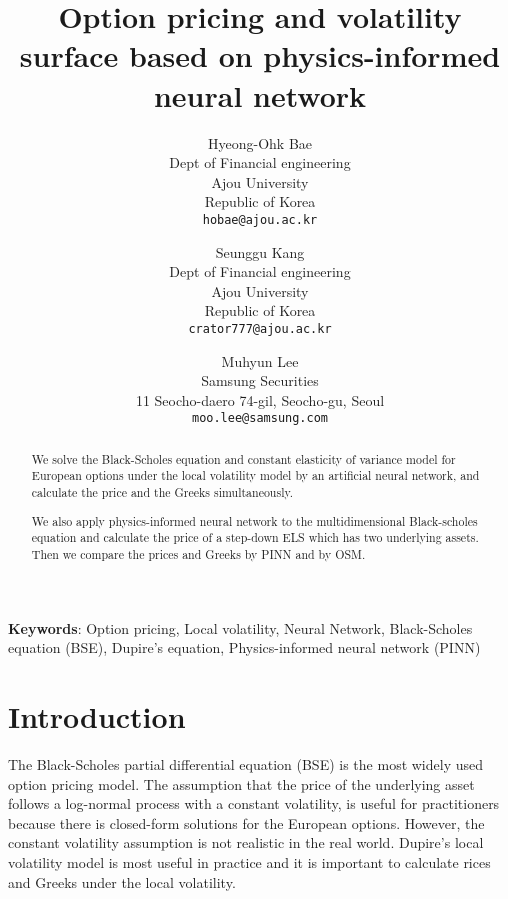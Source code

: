 \documentclass[11pt,reqno]{article}
\title{Option pricing and volatility surface based on physics-informed neural network}
\author{
  Hyeong-Ohk Bae \\
  Dept of Financial engineering \\
  Ajou University \\
  Republic of Korea\\
  \texttt{hobae@ajou.ac.kr} \\
  \and
  Seunggu Kang \\
  Dept of Financial engineering \\
  Ajou University \\
  Republic of Korea\\
  \texttt{crator777@ajou.ac.kr} \\
  \and
  Muhyun Lee \\
  Samsung Securities\\
  11 Seocho-daero 74-gil, Seocho-gu, Seoul\\
  \texttt{moo.lee@samsung.com}
}
\numberwithin{equation}{section}
\begin{document}
\maketitle

\begin{abstract}
We solve the Black-Scholes equation and constant elasticity of variance model
for European options
under the local volatility model
 by an artificial neural network, and calculate the price and the Greeks simultaneously.


We also apply physics-informed neural network to the multidimensional Black-scholes equation
 and calculate the price of a step-down ELS which has two underlying assets.
  Then we compare the prices and Greeks by PINN and by OSM.
\end{abstract}
\noindent\textbf{Keywords}: Option pricing, Local volatility, Neural Network,
Black-Scholes equation (BSE), Dupire's equation, Physics-informed neural network (PINN)


\section{Introduction}

The Black-Scholes partial differential equation (BSE) \cite{Black-Scholes-Merton} is the most widely used option pricing model.
 The assumption that the price of the underlying asset follows a log-normal process
  with a constant volatility, is useful for practitioners because there is closed-form solutions
   for the European options.
  However, the constant volatility assumption is not realistic in the real world.
   Dupire’s local volatility model is most useful in practice and 
   it is important to calculate rices and Greeks under the local volatility. 
\end{document}
